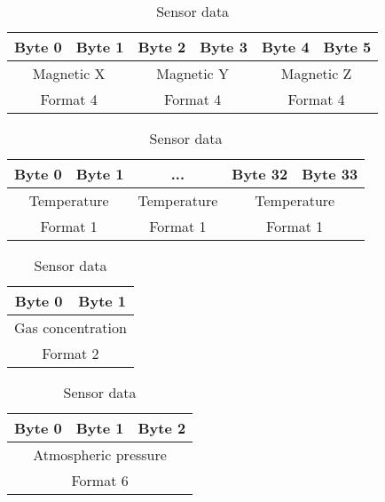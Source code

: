 \begin{table}[H]
    \centering
    {
    \begin{tabular}{|c c c c c c|}
        \hline
        \textbf{Byte 0} & \textbf{Byte 1}  & \textbf{Byte 2} & \textbf{Byte 3} & \textbf{Byte 4} & \textbf{Byte 5}\\
        \hline
        \hline
        \multicolumn{2}{|c|}{Magnetic X} & \multicolumn{2}{|c|}{Magnetic Y}  & \multicolumn{2}{|c|}{Magnetic Z}\\
        \multicolumn{2}{|c|}{Format 4} & \multicolumn{2}{|c|}{Format 4}  & \multicolumn{2}{|c|}{Format 4}\\
        \hline
    \end{tabular}
    }
    \caption{Sensor data}
    \label{table:sensor10}
\end{table}

\begin{table}[H]
    \centering
    {
    \begin{tabular}{|c c c c c|}
        \hline
        \textbf{Byte 0} & \textbf{Byte 1} & \textbf{...} & \textbf{Byte 32} & \textbf{Byte 33}\\
        \hline
        \hline
        \multicolumn{2}{|c|}{Temperature} & Temperature & \multicolumn{2}{|c|}{Temperature}\\
        \multicolumn{2}{|c|}{Format 1} & Format 1 & \multicolumn{2}{|c|}{Format 1}\\
        \hline
    \end{tabular}
    }
    \caption{Sensor data}
    \label{table:sensor11}
\end{table}

\begin{table}[H]
    \centering
    {
    \begin{tabular}{|c c|}
        \hline
        \textbf{Byte 0} & \textbf{Byte 1}\\
        \hline
        \hline
        \multicolumn{2}{|c|}{Gas concentration}\\
        \multicolumn{2}{|c|}{Format 2}\\
        \hline
    \end{tabular}
    }
    \caption{Sensor data}
    \label{table:sensor12}
\end{table}

\begin{table}[H]
    \centering
    {
    \begin{tabular}{|c c c|}
        \hline
        \textbf{Byte 0} & \textbf{Byte 1} & \textbf{Byte 2}\\
        \hline
        \hline
        \multicolumn{3}{|c|}{Atmospheric pressure}\\
        \multicolumn{3}{|c|}{Format 6}\\
        \hline
    \end{tabular}
    }
    \caption{Sensor data}
    \label{table:sensor13}
\end{table}

